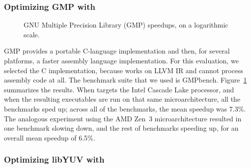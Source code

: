 \subsubsection{Optimizing GMP with \minotaur{}}

\begin{figure}[tbp]
  \centering
  \hfill
  \caption{GNU Multiple Precision Library (GMP) speedups, on a logarithmic scale.}
  \label{fig:gmp}
\end{figure}


GMP provides a portable C-language implementation and then, for
several platforms, a faster assembly language implementation.
%
For this evaluation, we selected the C implementation, because \minotaur{}
works on LLVM IR and cannot process assembly code at all.
%
The benchmark suite that we used is
GMPbench.
%
Figure~\ref{fig:gmp} summarizes the results.
%
When \minotaur{} targets the Intel Cascade Lake processor, and when the
resulting executables are run on that same microarchitecture,
all the benchmarks sped up;
across all of the benchmarks, the mean speedup was 7.3\%.
%
The analogous experiment using the AMD Zen~3 microarchitecture
resulted in one benchmark slowing down, and the rest of benchmarks
speeding up, for an overall mean speedup of 6.5\%.


\subsubsection{Optimizing libYUV with \minotaur{}}





